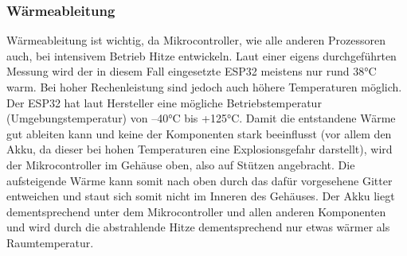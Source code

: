 \documentclass[11pt, twoside]{article}
\begin{document}
\subsubsection{Wärmeableitung}
Wärmeableitung ist wichtig, da Mikrocontroller, wie alle anderen Prozessoren auch, bei intensivem Betrieb Hitze entwickeln. Laut einer eigens durchgeführten Messung wird der in diesem Fall eingesetzte ESP32 meistens nur rund 38°C warm. Bei hoher Rechenleistung sind jedoch auch höhere Temperaturen möglich. Der ESP32 hat laut Hersteller eine mögliche Betriebstemperatur (Umgebungstemperatur) von –40°C bis +125°C. Damit die entstandene Wärme gut ableiten kann und keine der Komponenten stark beeinflusst (vor allem den Akku, da dieser bei hohen Temperaturen eine Explosionsgefahr darstellt), wird der Mikrocontroller im Gehäuse oben, also auf Stützen angebracht. Die aufsteigende Wärme kann somit nach oben durch das dafür vorgesehene Gitter entweichen und staut sich somit nicht im Inneren des Gehäuses. Der Akku liegt dementsprechend unter dem Mikrocontroller und allen anderen Komponenten und wird durch die abstrahlende Hitze dementsprechend nur etwas wärmer als Raumtemperatur.
\vspace{4mm}\newline
\parencite[vgl.][]{noauthor_urlnl06_nodate}
\end{document}
